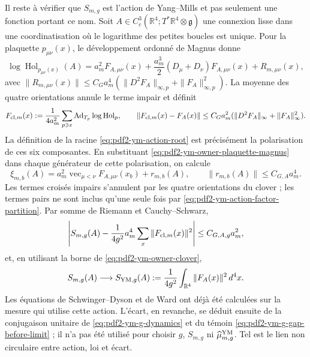 Il reste à vérifier que $S_{m,g}$ est l'action de Yang--Mills et pas seulement une fonction portant ce nom. Soit $A\in C_c^3(\mathbb R^4;T^*\mathbb R^4\otimes\mathfrak g)$ une connexion lisse dans une coordinatisation où le logarithme des petites boucles est unique. Pour la plaquette $p_{\mu\nu}(x)$, le développement ordonné de Magnus donne
\begin{equation}\label{eq:pdf2-ym-owner-plaquette-magnus}
 \log\operatorname{Hol}_{p_{\mu\nu}(x)}(A)
 =a_m^2F_{A,\mu\nu}(x)
  +\frac{a_m^3}{2}(D_\mu+D_\nu)F_{A,\mu\nu}(x)
  +R_{m,\mu\nu}(x),
\end{equation}
avec $\|R_{m,\mu\nu}(x)\|\le C_G a_m^4
(\|D^2F_A\|_{\infty,p}+\|F_A\|_{\infty,p}^2)$. La moyenne des quatre orientations annule le terme impair et définit
\begin{equation}\label{eq:pdf2-ym-owner-clover}
 F_{{\rm cl},m}(x)
 :=\frac1{4a_m^2}\sum_{p\ni x}
  \operatorname{Ad}_{T_p}\log\operatorname{Hol}_p,
 \qquad
 \|F_{{\rm cl},m}(x)-F_A(x)\|
 \le C_G a_m^2(\|D^2F_A\|_\infty+\|F_A\|_\infty^2).
\end{equation}
La définition de la racine \eqref{eq:pdf2-ym-action-root} est précisément la polarisation de ces six composantes. En substituant \eqref{eq:pdf2-ym-owner-plaquette-magnus} dans chaque générateur de cette polarisation, on calcule
\begin{equation}\label{eq:pdf2-ym-owner-action-root-smooth-chart}
 \xi_{m,b}(A)
 =a_m^2\operatorname{vec}_{\mu<\nu}F_{A,\mu\nu}(x_b)
  +r_{m,b}(A),
 \qquad
 \|r_{m,b}(A)\|\le C_{G,A}a_m^4.
\end{equation}
Les termes croisés impairs s’annulent par les quatre orientations du clover ;
les termes pairs ne sont inclus qu’une seule fois par
\eqref{eq:pdf2-ym-action-factor-partition}. Par somme de Riemann et
Cauchy--Schwarz,
\begin{equation}\label{eq:pdf2-ym-owner-action-error}
 \left|S_{m,g}(A)-\frac1{4g^2}
  a_m^4\sum_x\|F_{{\rm cl},m}(x)\|^2\right|
 \le C_{G,A,g}a_m^2,
\end{equation}
et, en utilisant la borne de \eqref{eq:pdf2-ym-owner-clover},
\begin{equation}\label{eq:pdf2-ym-owner-f2}
 S_{m,g}(A)\longrightarrow
 S_{{\rm YM},g}(A):=\frac1{4g^2}
 \int_{\mathbb R^4}\|F_A(x)\|^2\,d^4x.
\end{equation}
Les équations de Schwinger--Dyson et de Ward ont déjà été calculées sur la mesure qui utilise
cette action. L’écart, en revanche, se déduit ensuite de la conjugaison unitaire de
\eqref{eq:pdf2-ym-g-dynamics} et du témoin
\eqref{eq:pdf2-ym-g-gap-before-limit} ; il n’a pas été utilisé pour choisir $g$, $S_{m,g}$ ni
$\widehat\mu_{m,g}^{\rm YM}$. Tel est le lien non circulaire entre action, loi et écart.

